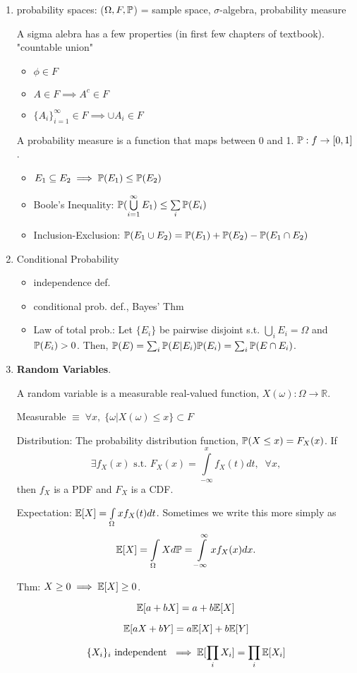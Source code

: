 \begin{enumerate}
	\item probability spaces: ($\Omega, F, \mathbb{P}$) = sample space, $\sigma$-algebra, probability measure

	A sigma alebra has a few properties (in first few chapters of textbook). "countable union"
	\begin{itemize}
		\item $\phi \in F$
		\item $A\in F \implies A^c\in F$
		\item $\{ A_i\}_{i=1}^\infty \in F \implies \cup A_i \in F$
	\end{itemize}

	A probability measure is a function that maps between 0 and 1. $\mathbb{P}: f\to [0,1]$.
	\begin{itemize}
		\item $E_1 \subseteq E_2 \implies \mathbb{P}(E_1) \leq \mathbb{P}(E_2)$
		\item Boole's Inequality: $\mathbb{P}(\bigcup\limits_{i=1}^\infty E_1)  \leq \sum\limits_i \mathbb{P}(E_i)$ 
		\item Inclusion-Exclusion: $\mathbb{P}(E_1\cup E_2) = \mathbb{P}(E_1) + \mathbb{P}(E_2) - \mathbb{P}(E_1 \cap E_2)$
	\end{itemize}
	
	\item  Conditional Probability 
	\begin{itemize}
		\item independence def.
		\item conditional prob. def.,  Bayes' Thm
		\item Law of total prob.: Let $\{E_i\}$ be pairwise disjoint s.t. $\bigcup_i E_i = \Omega$ and $\mathbb{P}(E_i) > 0$. Then, $\mathbb{P}(E) = \sum_i \mathbb{P}(E|E_i) \mathbb{P}(E_i) = \sum_i \mathbb{P}(E\cap E_i)$. 
	\end{itemize}
	
	\item \textbf{Random Variables}.
	
	A random variable is a measurable real-valued function, $X(\omega): \Omega\to \mathbb{R}$.

	Measurable $\equiv \; \forall x, \; \{\omega | X(\omega) \leq x\} \subset F $ 

	Distribution: The probability distribution function, $\mathbb{P}(X\leq x) = F_X(x)$.  
	If \[\exists f_X(x)\text{ s.t. }F_X(x) = \int\limits_{-\infty}^x f_X(t)dt, \;\; \forall x,\] 
	then $f_X$ is a PDF and  $F_X$ is a CDF.

	Expectation: $\mathbb{E}[X] = \int\limits_{\Omega} x f_X(t)dt$. Sometimes we write this more simply as 
	\[\mathbb{E}[X] = \int\limits_\Omega X d\mathbb{P} = \int\limits_{-\infty}^\infty x f_X(x) dx.\] 

	Thm: $X\geq 0 \implies \mathbb{E}[X] \geq 0$. 

	\[ \mathbb{E}[a + bX] = a + b\mathbb{E}[X]	 \]

	\[ \mathbb{E}[aX + bY] = a\mathbb{E}[X] + b\mathbb{E}[Y] \]

	\[ \{X_i\}_i\text{ independent }\implies \mathbb{E}[\prod_i X_i] = \prod_i \mathbb{E}[X_i] \]
\end{enumerate}

